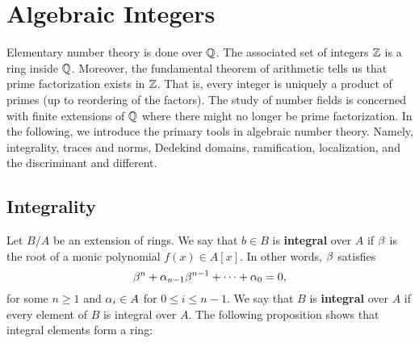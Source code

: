 \chapter{Algebraic Integers}
  Elementary number theory is done over $\mathbb{Q}$. The associated set of integers $\mathbb{Z}$ is a ring inside $\mathbb{Q}$. Moreover, the fundamental theorem of arithmetic tells us that prime factorization exists in $\mathbb{Z}$. That is, every integer is uniquely a product of primes (up to reordering of the factors). The study of number fields is concerned with finite extensions of $\mathbb{Q}$ where there might no longer be prime factorization. In the following, we introduce the primary tools in algebraic number theory. Namely, integrality, traces and norms, Dedekind domains, ramification, localization, and the discriminant and different.
  \section{Integrality}
    Let $B/A$ be an extension of rings. We say that $b \in B$ is \textbf{integral} over $A$ if $\beta$ is the root of a monic polynomial $f(x) \in A[x]$. In other words, $\beta$ satisfies
    \[
      \beta^{n}+\alpha_{n-1}\beta^{n-1}+\cdots+\alpha_{0} = 0,
    \]
    for some $n \ge 1$ and $\alpha_{i} \in A$ for $0 \le i \le n-1$. We say that $B$ is \textbf{integral} over $A$ if every element of $B$ is integral over $A$. The following proposition shows that integral elements form a ring:

